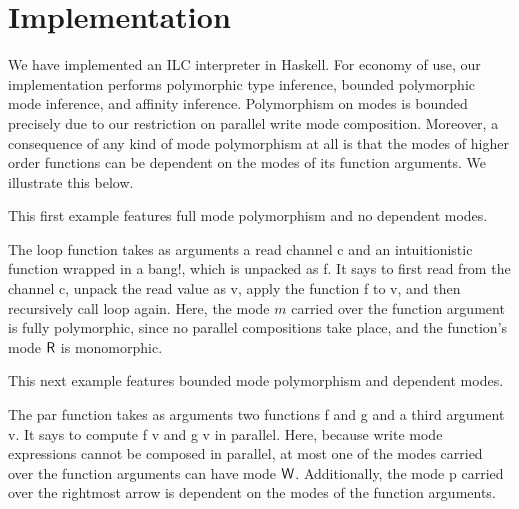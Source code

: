 \section{Implementation}
\label{sec:implementation}

We have implemented an ILC interpreter in Haskell.  For economy of use, our
implementation performs polymorphic type inference, bounded polymorphic mode
inference, and affinity inference. Polymorphism on modes is bounded precisely
due to our restriction on parallel write mode composition. Moreover, a
consequence of any kind of mode polymorphism at all is that the modes of higher
order functions can be dependent on the modes of its function arguments. We
illustrate this below.

This first example features full mode polymorphism and no dependent modes.

The \textsf{loop} function
takes as arguments a read channel \textsf{c} and an intuitionistic function
wrapped in a bang!, which is unpacked as \textsf{f}.  It says to first read from
the channel \textsf{c}, unpack the read value as \textsf{v}, apply the function
\textsf{f} to \textsf{v}, and then recursively call \textsf{loop} again. Here,
the mode $m$ carried over the function argument is fully polymorphic, since no
parallel compositions take place, and the function's mode $\textsf{R}$ is monomorphic.

This next example features bounded mode polymorphism and dependent modes.

The \textsf{par} function takes as arguments two functions \textsf{f} and
\textsf{g} and a third argument \textsf{v}. It says to compute \textsf{f v} and
\textsf{g v} in parallel. Here, because write mode expressions cannot be
composed in parallel, at most one of the modes carried over the function
arguments can have mode $\textsf{W}$. Additionally, the mode \textsf{p} carried over
the rightmost arrow is dependent on the modes of the function arguments.
